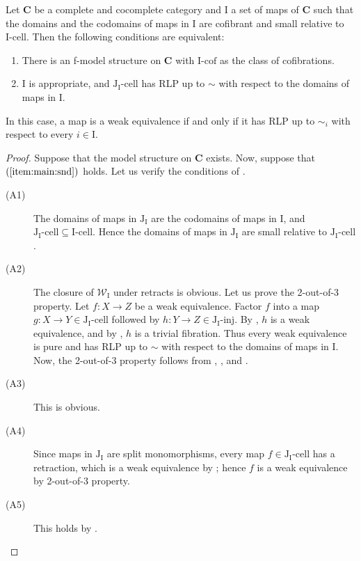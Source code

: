 \documentclass{amsart}
\theoremstyle{definition}
\newcommand{\we}{\mathcal{W}}
\newcommand{\cat}[1]{\mathbf{#1}}
\newcommand{\C}{\cat{C}}
\newcommand{\I}{\mathrm{I}}
\newcommand{\J}{\mathrm{J}}
\newcommand{\class}[2]{#1\text{-}\mathrm{#2}}
\newcommand{\Iinj}[1][\I]{\class{#1}{inj}}
\newcommand{\Icell}[1][\I]{\class{#1}{cell}}
\newcommand{\Icof}[1][\I]{\class{#1}{cof}}
\newcommand{\Jinj}[1][]{\Iinj[\J#1]}
\newcommand{\Jcell}[1][]{\Icell[\J#1]}
\begin{document}
\begin{thm}[main]
Let $\C$ be a complete and cocomplete category and $\I$ a set of maps of $\C$ such that
the domains and the codomains of maps in $\I$ are cofibrant and small relative to $\Icell$.
Then the following conditions are equivalent:
\begin{enumerate}
\item There is an f-model structure on $\C$ with $\Icof$ as the class of cofibrations.
\item \label{item:main:snd} $\I$ is appropriate, and $\Jcell[_\I]$ has RLP up to $\sim$ with respect to the domains of maps in $\I$.
\end{enumerate}
In this case, a map is a weak equivalence if and only if it has RLP up to $\sim_i$ with respect to every $i \in \I$.
\end{thm}
\begin{proof}
Suppose that the model structure on $\C$ exists.
Now, suppose that $(\ref{item:main:snd})$ holds.
Let us verify the conditions of .
\begin{description}
\item[(A1)] The domains of maps in $\J_\I$ are the codomains of maps in $\I$, and $\Jcell[_\I] \subseteq \Icell$.
Hence the domains of maps in $\J_\I$ are small relative to $\Jcell[_\I]$.
\item[(A2)] The closure of $\we_\I$ under retracts is obvious.
Let us prove the 2-out-of-3 property.
Let $f : X \to Z$ be a weak equivalence.
Factor $f$ into a map $g : X \to Y \in \Jcell[_\I]$ followed by $h : Y \to Z \in \Jinj[_\I]$.
By , $h$ is a weak equivalence, and by , $h$ is a trivial fibration.
Thus every weak equivalence is pure and has RLP up to $\sim$ with respect to the domains of maps in $\I$.
Now, the 2-out-of-3 property follows from , , and .
\item[(A3)] This is obvious.
\item[(A4)] Since maps in $\J_\I$ are split monomorphisms, every map
$f \in \Jcell[_\I]$ has a retraction, which is a weak equivalence by
; hence $f$ is a weak equivalence by 2-out-of-3 property.
\item[(A5)] This holds by .
\end{description}
\end{proof}
\end{document}
